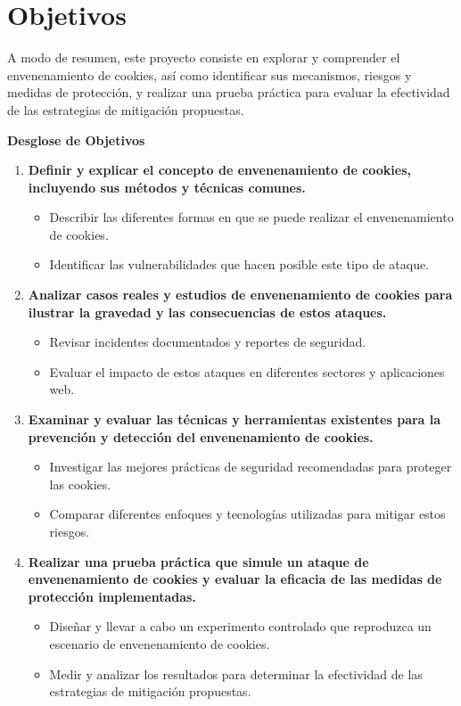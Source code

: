 \section{Objetivos}

A modo de resumen, este proyecto consiste en explorar y comprender el envenenamiento de cookies, así como identificar sus mecanismos, riesgos y medidas de protección, y realizar una prueba práctica para evaluar la efectividad de las estrategias de mitigación propuestas.

\bigskip

\textbf{Desglose de Objetivos}
\begin{enumerate}
    \item {\textbf{Definir y explicar el concepto de envenenamiento de cookies, incluyendo sus métodos y técnicas comunes.}
    \begin{itemize}
        \item Describir las diferentes formas en que se puede realizar el envenenamiento de cookies.
        \item Identificar las vulnerabilidades que hacen posible este tipo de ataque.
    \end{itemize} }

    \item {\textbf{Analizar casos reales y estudios de envenenamiento de cookies para ilustrar la gravedad y las consecuencias de estos ataques.}
    \begin{itemize}
        \item Revisar incidentes documentados y reportes de seguridad.
        \item Evaluar el impacto de estos ataques en diferentes sectores y aplicaciones web.
    \end{itemize} }

    \item {\textbf{Examinar y evaluar las técnicas y herramientas existentes para la prevención y detección del envenenamiento de cookies.}
    \begin{itemize}
        \item Investigar las mejores prácticas de seguridad recomendadas para proteger las cookies.
        \item Comparar diferentes enfoques y tecnologías utilizadas para mitigar estos riesgos.
    \end{itemize} }

    \item {\textbf{Realizar una prueba práctica que simule un ataque de envenenamiento de cookies y evaluar la eficacia de las medidas de protección implementadas.}
    \begin{itemize}
        \item Diseñar y llevar a cabo un experimento controlado que reproduzca un escenario de envenenamiento de cookies.
        \item Medir y analizar los resultados para determinar la efectividad de las estrategias de mitigación propuestas.
    \end{itemize} }


\end{enumerate}
